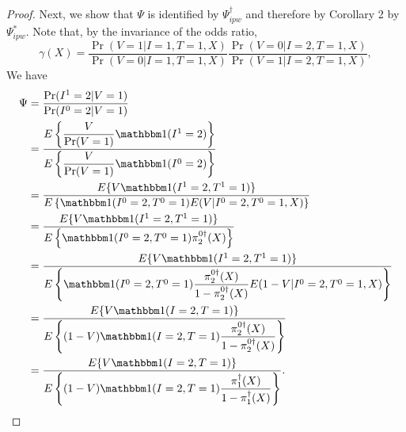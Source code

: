 \begin{appendix}
\begin{proof}
        Next, we show that $\Psi$ is identified by $\Psi^\dagger_{ipw}$ and therefore by Corollary 2 by $\Psi^*_{ipw}$. Note that, by the invariance of the odds ratio, 
        \begin{equation*}
            \gamma(X) = \dfrac{\Pr(V = 1 | I = 1, T = 1, X)}{\Pr(V = 0 | I = 1, T = 1, X)} \dfrac{\Pr(V = 0 | I = 2, T = 1, X)}{\Pr(V = 1 | I = 2, T = 1, X)},
        \end{equation*}
        We have
        \begin{align*}
        \Psi &= \dfrac{\Pr(I^1=2|V=1)}{\Pr(I^0=2|V=1)} \\
        &= \dfrac{E\left\{\dfrac{V}{\Pr(V=1)} \mathbbm 1 (I^1 = 2)\right\}}{E\left\{\dfrac{V}{\Pr(V=1)}\mathbbm 1 (I^0 = 2)\right\}} \\
        &= \dfrac{E\{V \mathbbm 1 (I^1 = 2, T^1 = 1)\}}{E\left\{\mathbbm 1 (I^0 = 2, T^0 = 1) E(V | I^0 = 2, T^0 = 1, X)\right\}} \\
        &= \dfrac{E\{V \mathbbm 1 (I^1 = 2, T^1 = 1)\}}{E\left\{\mathbbm 1 (I^0 = 2, T^0 = 1) \pi^{0\dagger}_2(X)\right\}} \\
        &= \dfrac{E\{V \mathbbm 1 (I^1 = 2, T^1 = 1)\}}{E\left\{\mathbbm 1 (I^0 = 2, T^0 = 1) \dfrac{\pi^{0\dagger}_2(X)}{1-\pi^{0\dagger}_2(X)}E(1-V|I^0 = 2, T^0 = 1, X)\right\}} \\
        &= \dfrac{E\{V \mathbbm 1 (I = 2, T = 1)\}}{E\left\{(1 - V)\mathbbm 1 (I = 2, T = 1) \dfrac{\pi^{0\dagger}_2(X)}{1-\pi^{0\dagger}_2(X)}\right\}} \\
        &= \dfrac{E\{V \mathbbm 1 (I = 2, T = 1)\}}{E\left\{(1 - V)\mathbbm 1 (I = 2, T = 1) \dfrac{\pi^\dagger_1(X)}{1-\pi^\dagger_1(X)}\right\}}.
    \end{align*}
    \end{proof}

\newpage


\end{appendix}
